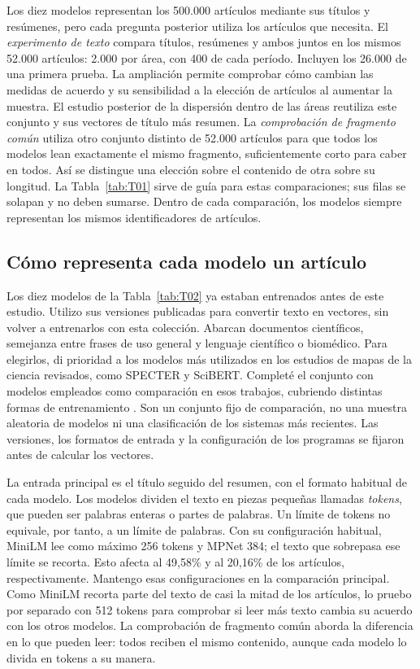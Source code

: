 \documentclass[12pt]{article}
\begin{document}
Los diez modelos representan los 500.000 artículos mediante sus títulos y resúmenes, pero cada pregunta posterior utiliza los artículos que necesita. El \emph{experimento de texto} compara títulos, resúmenes y ambos juntos en los mismos 52.000 artículos: 2.000 por área, con 400 de cada período. Incluyen los 26.000 de una primera prueba. La ampliación permite comprobar cómo cambian las medidas de acuerdo y su sensibilidad a la elección de artículos al aumentar la muestra. El estudio posterior de la dispersión dentro de las áreas reutiliza este conjunto y sus vectores de título más resumen. La \emph{comprobación de fragmento común} utiliza otro conjunto distinto de 52.000 artículos para que todos los modelos lean exactamente el mismo fragmento, suficientemente corto para caber en todos. Así se distingue una elección sobre el contenido de otra sobre su longitud. La Tabla~\ref{tab:T01} sirve de guía para estas comparaciones; sus filas se solapan y no deben sumarse. Dentro de cada comparación, los modelos siempre representan los mismos identificadores de artículos.


\subsection{Cómo representa cada modelo un artículo}
Los diez modelos de la Tabla~\ref{tab:T02} ya estaban entrenados antes de este estudio. Utilizo sus versiones publicadas para convertir texto en vectores, sin volver a entrenarlos con esta colección. Abarcan documentos científicos, semejanza entre frases de uso general y lenguaje científico o biomédico. Para elegirlos, di prioridad a los modelos más utilizados en los estudios de mapas de la ciencia revisados, como SPECTER y SciBERT. Completé el conjunto con modelos empleados como comparación en esos trabajos, cubriendo distintas formas de entrenamiento \citep{refbe130e2973,refc0e2cc29e0,ref07e33b3339}. Son un conjunto fijo de comparación, no una muestra aleatoria de modelos ni una clasificación de los sistemas más recientes. Las versiones, los formatos de entrada y la configuración de los programas se fijaron antes de calcular los vectores.

La entrada principal es el título seguido del resumen, con el formato habitual de cada modelo. Los modelos dividen el texto en piezas pequeñas llamadas \emph{tokens}, que pueden ser palabras enteras o partes de palabras. Un límite de tokens no equivale, por tanto, a un límite de palabras. Con su configuración habitual, MiniLM lee como máximo 256 tokens y MPNet 384; el texto que sobrepasa ese límite se recorta. Esto afecta al 49,58\% y al 20,16\% de los artículos, respectivamente. Mantengo esas configuraciones en la comparación principal. Como MiniLM recorta parte del texto de casi la mitad de los artículos, lo pruebo por separado con 512 tokens para comprobar si leer más texto cambia su acuerdo con los otros modelos. La comprobación de fragmento común aborda la diferencia en lo que pueden leer: todos reciben el mismo contenido, aunque cada modelo lo divida en tokens a su manera.
\end{document}
